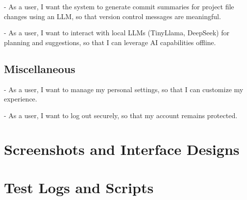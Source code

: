 \documentclass{report}
\begin{document}
- As a user, I want the system to generate commit summaries for project file changes using an LLM, so that version control messages are meaningful.

- As a user, I want to interact with local LLMs (TinyLlama, DeepSeek) for planning and suggestions, so that I can leverage AI capabilities offline.

\section{Miscellaneous}
- As a user, I want to manage my personal settings, so that I can customize my experience.

- As a user, I want to log out securely, so that my account remains protected.

\chapter{Screenshots and Interface Designs}
\chapter{Test Logs and Scripts}
\end{document}

